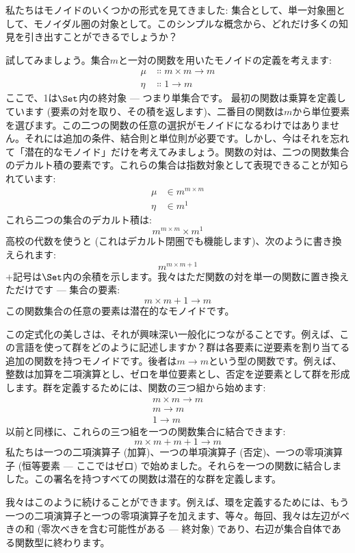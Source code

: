 
\lettrine[lhang=0.17]{私}{たち}はモノイドのいくつかの形式を見てきました: 集合として、単一対象圏として、モノイダル圏の対象として。このシンプルな概念から、どれだけ多くの知見を引き出すことができるでしょうか？

試してみましょう。集合$m$と一対の関数を用いたモノイドの定義を考えます: 
\begin{align*}
  \mu  & \Colon m\times{}m \to m \\
  \eta & \Colon 1 \to m
\end{align*}
ここで、1は$\Set$内の終対象 --- つまり単集合です。
最初の関数は乗算を定義しています (要素の対を取り、その積を返します)、二番目の関数は$m$から単位要素を選びます。この二つの関数の任意の選択がモノイドになるわけではありません。それには追加の条件、結合則と単位則が必要です。しかし、今はそれを忘れて「潜在的なモノイド」だけを考えてみましょう。関数の対は、二つの関数集合のデカルト積の要素です。これらの集合は指数対象として表現できることが知られています: 
\begin{align*}
  \mu  & \in m^{m\times{}m} \\
  \eta & \in m^1
\end{align*}
これら二つの集合のデカルト積は: 
\[m^{m\times{}m}\times{}m^1\]
高校の代数を使うと (これはデカルト閉圏でも機能します)、次のように書き換えられます: 
\[m^{m\times{}m + 1}\]
$+$記号は$\Set$内の余積を示します。我々はただ関数の対を単一の関数に置き換えただけです --- 集合の要素: 
\[m\times{}m + 1 \to m\]
この関数集合の任意の要素は潜在的なモノイドです。

この定式化の美しさは、それが興味深い一般化につながることです。例えば、この言語を使って群をどのように記述しますか？群は各要素に逆要素を割り当てる追加の関数を持つモノイドです。後者は$m \to m$という型の関数です。例えば、整数は加算を二項演算とし、ゼロを単位要素とし、否定を逆要素として群を形成します。群を定義するためには、関数の三つ組から始めます: 
\begin{align*}
  m\times{}m \to m \\
  m \to m          \\
  1 \to m
\end{align*}
以前と同様に、これらの三つ組を一つの関数集合に結合できます: 
\[m\times{}m + m + 1 \to m\]
私たちは一つの二項演算子 (加算)、一つの単項演算子 (否定)、一つの零項演算子 (恒等要素 --- ここではゼロ) で始めました。それらを一つの関数に結合しました。この署名を持つすべての関数は潜在的な群を定義します。

我々はこのように続けることができます。例えば、環を定義するためには、もう一つの二項演算子と一つの零項演算子を加えます、等々。毎回、我々は左辺がべきの和 (零次べきを含む可能性がある --- 終対象) であり、右辺が集合自体である関数型に終わります。

